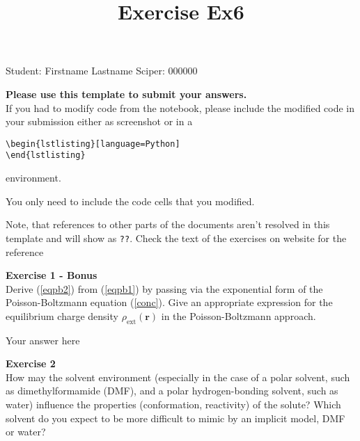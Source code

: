 \documentclass{article}
\title{Exercise Ex6}
\begin{document}
\maketitle\maketitle
\begin{center}\logo\end{center}


Student:  Firstname Lastname    Sciper: 000000

\begin{mdframed}
\textbf{Please use this template to submit your answers.}\\
If you had to modify code from the notebook, please include the modified code in your submission either as screenshot or in a

\begin{verbatim}
\begin{lstlisting}[language=Python]
\end{lstlisting}
\end{verbatim}

environment.

You only need to include the code cells that you modified.

Note, that references to other parts of the documents aren't resolved in this template and will show as \texttt{??}. Check the text of the exercises on website for the reference
\end{mdframed}

\begin{mdframed}
\textbf{Exercise 1 - Bonus}\\
Derive (\ref{eqpb2}) from (\ref{eqpb1}) by passing via the exponential form of the Poisson-Boltzmann equation (\ref{conc}).    Give an appropriate expression for the equilibrium charge density  $\rho_\text{ext}(\mathbf{r})$ in the Poisson-Boltzmann approach.
\end{mdframed}

Your answer here

\begin{mdframed}
\textbf{Exercise 2}\\
How may the solvent environment (especially in the case of a polar
solvent, such as dimethylformamide (DMF), and a polar
hydrogen-bonding solvent, such as water) influence the properties
(conformation, reactivity) of the solute? Which solvent do you
expect to be more difficult to mimic by an implicit model, DMF or
water?
\end{mdframed}
\end{document}
